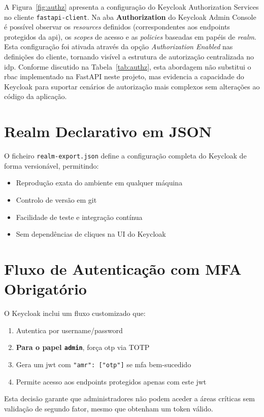 A Figura~\ref{fig:authz} apresenta a configuração do Keycloak Authorization Services no cliente \texttt{fastapi-client}. Na aba \textbf{Authorization} do Keycloak Admin Console é possível observar os \textit{resources} definidos (correspondentes aos endpoints protegidos da \gls{api}), os \textit{scopes} de acesso e as \textit{policies} baseadas em papéis de \textit{realm}. Esta configuração foi ativada através da opção \textit{Authorization Enabled} nas definições do cliente, tornando visível a estrutura de autorização centralizada no \gls{idp}. Conforme discutido na Tabela~\ref{tab:authz}, esta abordagem não substitui o \gls{rbac} implementado na FastAPI neste projeto, mas evidencia a capacidade do Keycloak para suportar cenários de autorização mais complexos sem alterações ao código da aplicação.

\section{Realm Declarativo em JSON}

O ficheiro \texttt{realm-export.json} define a configuração completa do Keycloak de forma versionável, permitindo:
\begin{itemize}
  \item Reprodução exata do ambiente em qualquer máquina
  \item Controlo de versão em git
  \item Facilidade de teste e integração contínua
  \item Sem dependências de cliques na UI do Keycloak
\end{itemize}

\section{Fluxo de Autenticação com MFA Obrigatório}

O Keycloak inclui um fluxo customizado que:
\begin{enumerate}
  \item Autentica por username/password
  \item \textbf{Para o papel \texttt{admin}}, força \gls{otp} via TOTP
  \item Gera um \gls{jwt} com \texttt{"amr": ["otp"]} se \gls{mfa} bem-sucedido
  \item Permite acesso aos endpoints protegidos apenas com este \gls{jwt}
\end{enumerate}

Esta decisão garante que administradores não podem aceder a áreas críticas sem validação de segundo fator, mesmo que obtenham um token válido.
